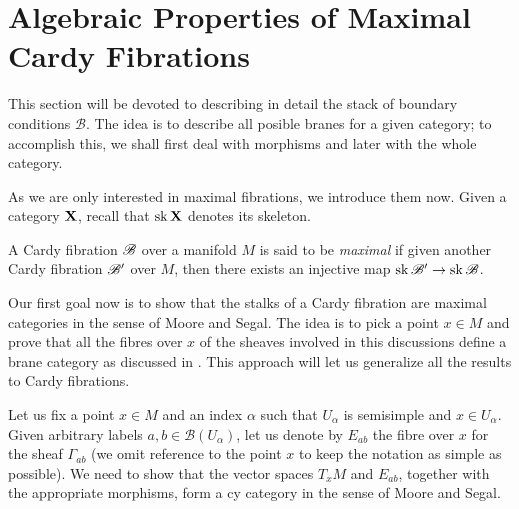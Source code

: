  
\vspace{250pt}

\section{Algebraic Properties of Maximal Cardy Fibrations}

This section will be devoted to describing in detail the stack of boundary conditions $\mathscr{B}$. The idea is to describe all posible branes for a given category; to accomplish this, we shall first deal with morphisms and later with the whole category.

As we are only interested in maximal fibrations, we introduce them now. Given a category ${\bf X}$, recall that $\operatorname{sk}{\bf X}$ denotes its skeleton.

\begin{defi}\label{maximal}
A Cardy fibration $\mathscr{B}$ over a manifold $M$ is said to be \emph{maximal} if given another Cardy fibration $\mathscr{B}'$ over $M$, then there exists an injective map $\operatorname{sk}\mathscr{B}'\to \operatorname{sk}\mathscr{B}$.
\end{defi}

Our first goal now is to show that the stalks of a Cardy fibration are maximal categories in the sense of Moore and Segal. The idea is to pick a point $x\in M$ and prove that all the fibres over $x$ of the sheaves involved in this discussions define a brane category as discussed in \cite{moore_segal1}. This approach will let us generalize all the results to Cardy fibrations.

Let us fix a point $x\in M$ and an index $\alpha$ such that $U_\alpha$ is semisimple and $x\in U_\alpha$. Given arbitrary labels $a,b\in \mathscr{B}(U_\alpha )$, let us denote by $E_{ab}$ the fibre over $x$ for the sheaf $\Gamma_{ab}$ (we omit reference to the point $x$ to keep the notation as simple as possible). We need to show that the vector spaces $T_xM$ and $E_{ab}$, together with the appropriate morphisms, form a {\sc cy} category in the sense of Moore and Segal.

